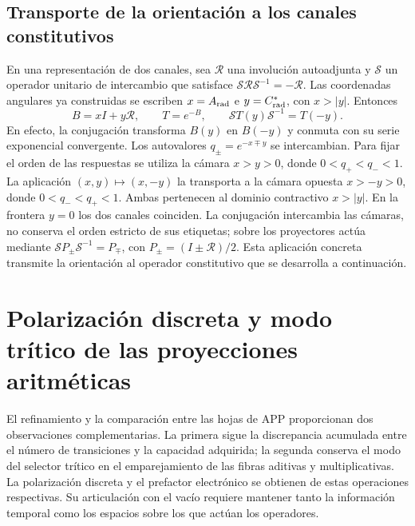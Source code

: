 \section{Transporte de la orientación a los canales constitutivos}

En una representación de dos canales, sea $\mathcal R$ una involución
autoadjunta y $\mathcal S$ un operador unitario de intercambio que satisface
$\mathcal S\mathcal R\mathcal S^{-1}=-\mathcal R$. Las coordenadas angulares
ya construidas se escriben $x=A_{\rm rad}$ e $y=C^*_{\rm rad}$, con $x>|y|$.
Entonces
\begin{equation}
 B=xI+y\mathcal R,\qquad T=e^{-B},\qquad
 \mathcal ST(y)\mathcal S^{-1}=T(-y).
 \label{x_reciprocidad:iii:eq:channel-conjugation}
\end{equation}
En efecto, la conjugación transforma $B(y)$ en $B(-y)$ y conmuta con su serie
exponencial convergente. Los autovalores $q_\pm=e^{-x\mp y}$ se intercambian.
Para fijar el orden de las respuestas se utiliza la cámara $x>y>0$, donde
$0<q_+<q_-<1$. La aplicación $(x,y)\mapsto(x,-y)$ la transporta a la
cámara opuesta $x>-y>0$, donde $0<q_-<q_+<1$. Ambas pertenecen al dominio
contractivo $x>|y|$. En la frontera $y=0$ los dos canales coinciden.
La conjugación intercambia las cámaras, no conserva el orden estricto de
sus etiquetas; sobre los proyectores actúa mediante
$\mathcal SP_\pm\mathcal S^{-1}=P_\mp$, con
$P_\pm=(I\pm\mathcal R)/2$.
Esta aplicación concreta transmite la orientación al operador constitutivo que
se desarrolla a continuación.



\chapter{Polarización discreta y modo trítico de las proyecciones aritméticas}
\label{x_reciprocidad:iii:sec:vacancias-prefactor}

El refinamiento y la comparación entre las hojas de APP proporcionan dos
observaciones complementarias. La primera sigue la discrepancia acumulada
entre el número de transiciones y la capacidad adquirida; la segunda conserva
el modo del selector trítico en el emparejamiento de las fibras aditivas y
multiplicativas. La polarización discreta y el prefactor electrónico se
obtienen de estas operaciones respectivas. Su articulación con el vacío
requiere mantener tanto la información temporal como los espacios sobre los
que actúan los operadores.


